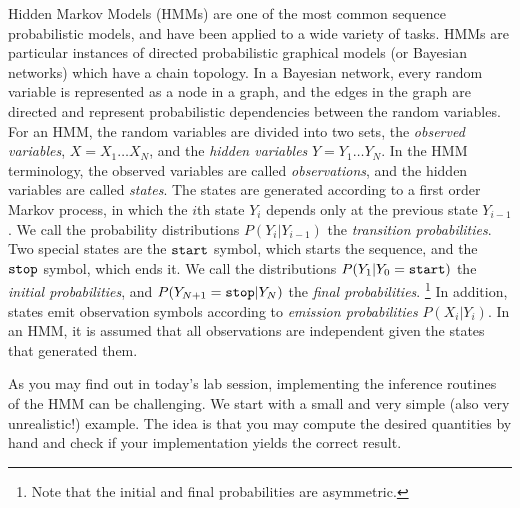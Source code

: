 
Hidden Markov Models (HMMs) are one of the most common sequence
probabilistic models, and have been applied to a wide variety of
tasks. HMMs are particular instances of directed probabilistic graphical models (or Bayesian networks) which have a chain topology. 
In a
Bayesian network, every random variable is represented as a node in a
graph, and the edges in the graph are directed and represent
probabilistic dependencies between the random variables. For an HMM, the random variables are divided into two sets, the 
\emph{observed variables}, $X = X_1\ldots X_N$, 
and the \emph{hidden variables} $Y = Y_1\ldots Y_N$.
In the HMM
terminology, the observed variables are called \emph{observations}, and the
hidden variables are called \emph{states}. 
The states are generated according to a first order Markov process, in which the $i$th state $Y_i$ depends only 
at the previous state $Y_{i-1}$. 
We call the probability distributions 
$P(Y_{i}|Y_{i-1})$ the \emph{transition probabilities}.
Two special states are the ${\tt start}$ symbol,
which starts the sequence, and 
the ${\tt stop}$ symbol, which ends it. 
We call the distributions 
$P(Y_{1}|Y_{0} = {\tt start})$ the \emph{initial probabilities}, and 
$P(Y_{N+1}={\tt stop} |Y_{N})$ the \emph{final probabilities}.%
\footnote{Note that the initial and final probabilities 
are asymmetric.} %
In addition, states emit observation symbols according to
\emph{emission probabilities}
$P(X_i|Y_i)$. In an HMM, it is assumed that all
observations are independent given the states
that generated them.


As you may find out in today's lab session, 
implementing the inference routines of the HMM can be challenging. We start with a small and very
simple (also very unrealistic!) example. The idea is that you may compute the desired
quantities by hand and check if your implementation yields the correct result. 

